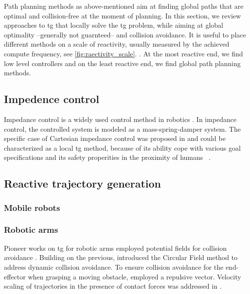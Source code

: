 Path planning methods as above-mentioned aim at finding
global paths that are optimal and collision-free at the
moment of planning. In this section, we review approaches to
\ac{tg} that locally solve the \ac{tg} problem, while aiming
at global optimality --generally not guarnteed-- and
collision avoidance. It is useful to place different methods
on a scale of reactivity, usually measured by the achieved
compute frequency, see \cref{fig:raectivity_scale}.
. At the most reactive end, we find low
level controllers and on the least reactive end, we find
global path planning methods.

\subsection{Impedence control}%
\label{sub:impedence_control}

Impedance control is a widely used control method in
robotics \cite{Hogan1985}. In impedance control, the
controlled system is modeled as a mass-spring-damper system.
The specific case of Cartesian impedance control was
proposed in \cite{Hollerbach1985} and could be characterized
as a local \ac{tg} method, because of its ability cope with
various goal specifications and its safety properities in
the proximity of humans
~\cite{van2022disagreement,lachner2022shaping,hjorth2024enabling}.


\subsection{Reactive trajectory generation}%
\label{sub:reactive_trajectory_generation}

\subsubsection{Mobile robots}
\label{subsub:mobile_robots}

\subsubsection{Robotic arms}
\label{subsub:robotic_arms}

Pioneer works on \ac{tg} for robotic arms
employed potential fields for collision avoidance
\cite{Khatib1985,Khatib1986real,park2008movement}. Building
on the previous, \cite{Haddadin2011} introduced the Circular
Field method to address dynamic collision avoidance. To
ensure collision avoidance for the end-effector when
grasping a moving obstacle, \cite{Du2018} employed a
repulsive vector.
Velocity scaling of trajectories in the presence of 
contact forces was addressed in \cite{haddadin2010real}.

